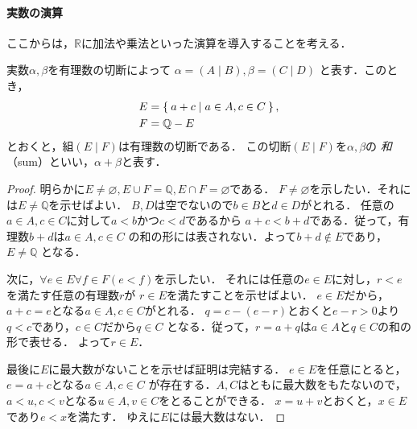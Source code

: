    \paragraph{実数の演算}
    ここからは，$\mathbb{R}$に加法や乗法といった演算を導入することを考える．
    \begin{thm} \label{thm:realwawelldef}
      実数$\alpha ,  \beta$を有理数の切断によって
      $\alpha = (A \mid B) ,  \beta = (C \mid D)$
      と表す．このとき，
      \begin{align*}
        E & = \Set{ a+ c \mid a \in A,  c \in C} , \\
        F & = \mathbb{Q} - E
      \end{align*}
      とおくと，組$(E \mid F)$は有理数の切断である．
      この切断$(E \mid F)$を$\alpha ,  \beta$の
      \emph{和}（sum）といい，$\alpha + \beta$と表す．
    \end{thm}
    \begin{proof}
      明らかに$E \neq \varnothing,  
      E \cup F = \mathbb{Q} ,  E \cap F = \varnothing$である．
      $F \neq \varnothing$を示したい．それには$E \neq \mathbb{Q}$を示せばよい．
      $ B,   D$は空でないので$b \in B$と$d \in D$がとれる．
      任意の$a \in A,  c \in C$に対して$a<b$かつ$c<d$であるから
      $a+c<b+d$である．従って，有理数$b+d$は$a \in A ,  c \in C$
      の和の形には表されない．よって$b+d \notin E$であり，$E \neq \mathbb{Q}$
      となる．

      次に，$\forall e \in E \forall f \in F(e<f)$を示したい．
      それには任意の$e \in E$に対し，$r<e$を満たす任意の有理数$r$が
      $r \in E$を満たすことを示せばよい．
      $e \in E$だから，$a+c = e$となる$a \in A,  c \in C$がとれる．
      $q = c-( e-r)$とおくと$e-r>0$より$q<c$であり，$c \in C$だから$q \in C$
      となる．従って，$r=a+q$は$a \in A$と$q \in C$の和の形で表せる．
      よって$r \in E$．
      
      最後に$E$に最大数がないことを示せば証明は完結する．
      $e \in E$を任意にとると，$e= a+c$となる$a \in A,  c \in C $
      が存在する．$A,  C$はともに最大数をもたないので，
      $a < u ,  c<v$となる$u \in A ,  v \in C$をとることができる．
      $x=u+v$とおくと，$x \in E$であり$e<x$を満たす．
      ゆえに$E$には最大数はない．
    \end{proof}

